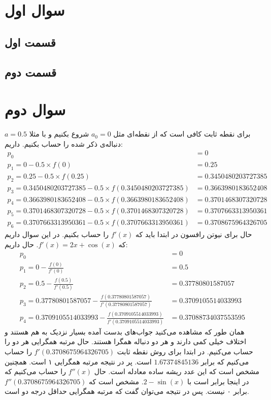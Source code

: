 \documentclass[]{article}
\begin{document}
\printheader

\section*{سوال اول}
\subsection*{قسمت اول}
\subsection*{قسمت دوم}
\section*{سوال دوم}
برای نقطه ثابت کافی است که از نقطه‌ای مثل
$a_0 = 0$
شروع بکنیم و با مثلا
$a = 0.5$
دنباله‌ی ذکر شده را حساب بکنیم. داریم:
\begin{align*}
    p_{0} &= 0\\
    p_{1} = 0 - 0.5 \times f(0) &= 0.25\\
    p_{2} = 0.25 - 0.5 \times f(0.25) &= 0.3450480203727385\\
    p_{3} = 0.3450480203727385 - 0.5 \times f(0.3450480203727385) &= 0.3663980183652408\\
    p_{4} = 0.3663980183652408 - 0.5 \times f(0.3663980183652408) &= 0.3701468307320728\\
    p_{5} = 0.3701468307320728 - 0.5 \times f(0.3701468307320728) &= 0.3707663313950361\\
    p_{6} = 0.3707663313950361 - 0.5 \times f(0.3707663313950361) &= \boxed{0.3708675964326705}
\end{align*}
حال برای نیوتن رافسون در ابتدا باید که
$f'(x)$
را حساب بکنیم. در این سوال داریم که
$f'(x) = 2x + \cos (x)$. حال داریم:
\begin{align*}
    p_{0} &= 0\\
    p_{1} = 0 - \frac{f(0)}{f'(0)} &= 0.5\\
    p_{2} = 0.5 - \frac{f(0.5)}{f'(0.5)} &= 0.37780801587057\\
    p_{3} = 0.37780801587057 - \frac{f(0.37780801587057)}{f'(0.37780801587057)} &= 0.3709105514033993\\
    p_{4} = 0.3709105514033993 - \frac{f(0.3709105514033993)}{f'(0.3709105514033993)} &= \boxed{0.37088734037553595}
\end{align*}
همان طور که مشاهده می‌کنید جواب‌های بدست آمده بسیار نزدیک به هم هستند و اختلاف خیلی کمی دارند و هر دو
دنباله همگرا هستند. حال مرتبه همگرایی هر دو را حساب می‌کنیم. در ابتدا برای روش نقطه ثابت
$f'(0.3708675964326705)$
را حساب می‌کنیم که برابر
$1.67374845136$
است. پر در نتیجه مرتبه همگرایی ۱ است. همچنین مشخص است که این عدد ریشه ساده معادله است. حال
$f''(x)$
را حساب می‌کنیم که در اینجا برابر است با
$2 - \sin (x)$.
مشخص است که
$f''(0.3708675964326705)$
برابر ۰ نیست. پس در نتیجه می‌توان گفت که مرتبه همگرایی حداقل درجه دو است.
\end{document}
